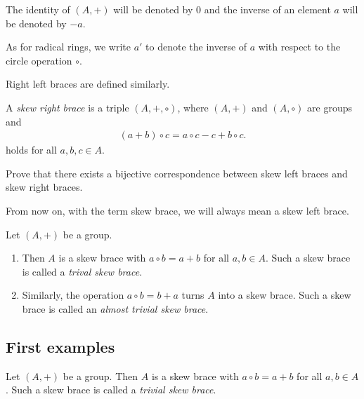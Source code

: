     \begin{convention}
         The identity of $(A,+)$ will be denoted by $0$ and the inverse of an element $a$ will be denoted by $-a$. 

         As for radical rings, we write $a'$ to denote the inverse of $a$ with respect to the circle operation $\circ$. 
    \end{convention}
        
    Right left braces are defined similarly.

    \begin{definition}
         A \emph{skew right brace} is a triple $(A,+,\circ)$, where 
        $(A,+)$ and $(A,\circ)$ 
	   are groups and 
	   \begin{align*}
	       (a+b)\circ c=a\circ c-c+b\circ c.
	   \end{align*}
	   holds for all $a,b,c\in A$. 
    \end{definition}

   \begin{exercise}
        Prove that there exists a bijective correspondence between skew left braces
        and skew right braces.
   \end{exercise}

    \begin{convention}
        From now on, with the term skew brace, we will always mean a skew left brace.
    \end{convention}

    \begin{examples}
        Let $(A,+)$ be a group. 
        \begin{enumerate}
            \item Then $A$ is a skew brace with
            $a\circ b=a+b$ for all $a,b\in A$. Such a skew brace is called a \emph{trival skew brace}.
            \item Similarly, the operation $a\circ b=b+a$ turns $A$ into a skew brace. Such a skew brace is called an \emph{almost trivial skew brace}. 
        \end{enumerate}
    \end{examples}

    \subsection{First examples}

    \begin{example}
        Let $(A,+)$ be a group. Then $A$ is a skew brace with
            $a\circ b=a+b$ for all $a,b\in A$. Such a skew brace is called a \emph{trivial skew brace}.
    \end{example}
    
